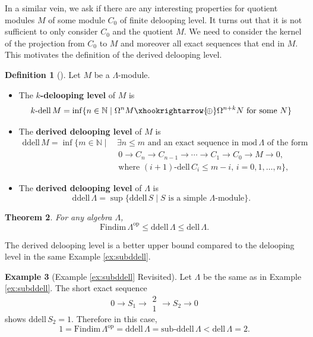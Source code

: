 \documentclass{conm-p-l}
\newcommand{\Findim}{\mathrm{Findim}\,}
\newcommand{\dell}{\mathrm{dell}\,}
\renewcommand{\dell}{\mathrm{dell}\,}
\newcommand{\op}{\mathrm{op}}
\newcommand{\N}{\mathbb{N}}
\renewcommand{\mod}{\mathrm{mod}\,}
\newcommand{\dirsum}{\xhookrightarrow{\!\oplus}}
\newcommand{\kdell}{k\text{-}\mathrm{dell}\,}
\newcommand{\ddell}{\mathrm{ddell}\,}
\newcommand{\subddell}{\mathrm{sub}\text{-}\mathrm{ddell}\,}
\newtheorem{theorem}{Theorem}[section]
\theoremstyle{definition}
\newtheorem{definition}[theorem]{Definition}
\newtheorem{example}[theorem]{Example}
\theoremstyle{remark}
\numberwithin{equation}{section}
\begin{document}
In a similar vein, we ask if there are any interesting properties for quotient modules $M$ of some module $C_0$ of finite delooping level. It turns out that it is not sufficient to only consider $C_0$ and the quotient $M$. We need to consider the kernel of the projection from $C_0$ to $M$ and moreover all exact sequences that end in $M$. This motivates the definition of the derived delooping level.

\begin{definition}[\cite{guo2025derived}]
\label{def:ddell}
Let $M$ be a $\Lambda$-module.
\begin{itemize}
\item The \textbf{$k$-delooping level} of $M$ is
\begin{align*}
\kdell M = \inf\{n\in\N\mid \Omega^n M \dirsum \Omega^{n+k} N \text{ for some $N$} \}
\end{align*}
\item The \textbf{derived delooping level} of $M$ is
\begin{align*}
\ddell M = \inf \{m\in\N \mid & \,\exists n\leq m \text{ and an exact sequence in $\mod\Lambda$ of the form} \\
& \,\, 0 \to C_n \to C_{n-1} \to \cdots \to C_1 \to C_0 \to M \to 0, \\
& \text{ where $(i+1)$-$\dell C_i\leq m-i$, } i=0,1,\dots,n  \},
\end{align*}
\item The \textbf{derived delooping level} of $\Lambda$ is 
\[
\ddell \Lambda = \sup \{\ddell S \mid S \text{ is a simple $\Lambda$-module} \}.
\]
\end{itemize}
\end{definition}

\begin{theorem}
For any algebra $\Lambda$,
\[
\Findim\Lambda^{\op} \leq \ddell\Lambda \leq \dell\Lambda.
\]
\end{theorem}

The derived delooping level is a better upper bound compared to the delooping level in the same Example \ref{ex:subddell}.

\begin{example}[Example \ref{ex:subddell} Revisited]
\label{ex:ddell}
Let $\Lambda$ be the same as in Example \ref{ex:subddell}. The short exact sequence
\[
0 \to S_1 \to \begin{matrix} 2 \\ 1 \end{matrix} \to S_2 \to 0
\]
shows $\ddell S_2 = 1$. Therefore in this case,
\[
1 = \Findim\Lambda^{\op} = \ddell\Lambda = \subddell\Lambda < \dell\Lambda = 2.
\]
\end{example}
\end{document}

